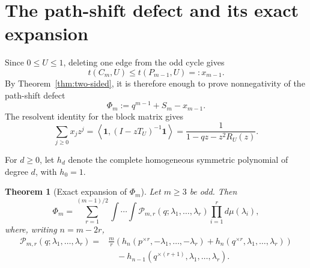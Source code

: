 \documentclass[11pt]{article}
\newtheorem{theorem}{Theorem}[section]
\newcommand{\one}{\mathbf 1}
\newcommand{\ip}[2]{\left\langle #1,#2\right\rangle}
\newcommand{\Pcal}{\mathcal P}
\begin{document}
\section{The path-shift defect and its exact expansion}\label{sec:expansion2}

Since $0\le U\le1$, deleting one edge from the odd cycle gives
\[
        t(C_m,U)\le t(P_{m-1},U)=:x_{m-1}.
\]
By Theorem~\ref{thm:two-sided}, it is therefore enough to prove nonnegativity of the path-shift defect
\begin{equation}\label{eq:Phi-def}
        \Phi_m:=q^{m-1}+S_m-x_{m-1}.
\end{equation}
The resolvent identity for the block matrix gives
\begin{equation}\label{eq:path-resolvent}
        \sum_{j\ge0}x_jz^j
        =\ip{\one}{(I-zT_U)^{-1}\one}
        =\frac1{1-qz-z^2R_U(z)}.
\end{equation}

For $d\ge0$, let $h_d$ denote the complete homogeneous symmetric polynomial of degree $d$, with $h_0=1$.

\begin{theorem}[Exact expansion of $\Phi_m$]\label{thm:expansion}
Let $m\ge3$ be odd.  Then
\begin{equation}\label{eq:Phi-expansion}
        \Phi_m=
        \sum_{r=1}^{(m-1)/2}\int\cdots\int
        \Pcal_{m,r}(q;\lambda_1,\ldots,\lambda_r)
        \prod_{i=1}^r d\mu(\lambda_i),
\end{equation}
where, writing $n=m-2r$,
\begin{equation}\label{eq:P-def}
\begin{aligned}
        \Pcal_{m,r}(q;\lambda_1,\ldots,\lambda_r)
        ={}&\frac mr\left(
        h_n(p^{\times r},-\lambda_1,\ldots,-\lambda_r)
        +h_n(q^{\times r},\lambda_1,\ldots,\lambda_r)
        \right)\\
        &\quad-h_{n-1}(q^{\times(r+1)},\lambda_1,\ldots,\lambda_r).
\end{aligned}
\end{equation}
\end{theorem}
\end{document}
